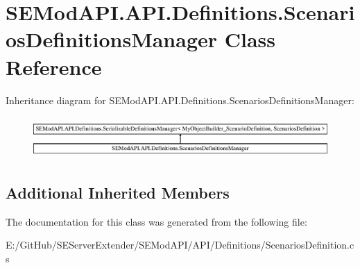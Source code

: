 \hypertarget{class_s_e_mod_a_p_i_1_1_a_p_i_1_1_definitions_1_1_scenarios_definitions_manager}{}\section{S\+E\+Mod\+A\+P\+I.\+A\+P\+I.\+Definitions.\+Scenarios\+Definitions\+Manager Class Reference}
\label{class_s_e_mod_a_p_i_1_1_a_p_i_1_1_definitions_1_1_scenarios_definitions_manager}
Inheritance diagram for S\+E\+Mod\+A\+P\+I.\+A\+P\+I.\+Definitions.\+Scenarios\+Definitions\+Manager\+:\begin{figure}[H]
\begin{center}
\leavevmode
\includegraphics[height=1.606887cm]{class_s_e_mod_a_p_i_1_1_a_p_i_1_1_definitions_1_1_scenarios_definitions_manager}
\end{center}
\end{figure}
\subsection*{Additional Inherited Members}


The documentation for this class was generated from the following file\+:\begin{DoxyCompactItemize}
\item 
E\+:/\+Git\+Hub/\+S\+E\+Server\+Extender/\+S\+E\+Mod\+A\+P\+I/\+A\+P\+I/\+Definitions/Scenarios\+Definition.\+cs\end{DoxyCompactItemize}
